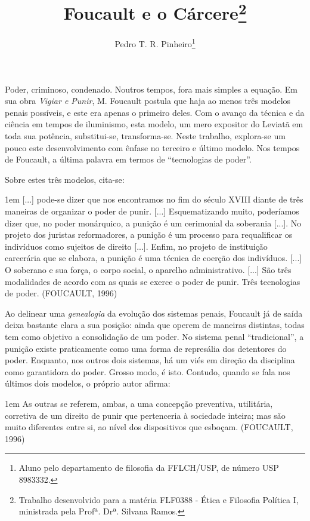 \documentclass[12pt,a4paper]{article}
\author{Pedro T. R. Pinheiro\footnote{Aluno pelo departamento de filosofia 
da FFLCH/USP, de número USP 8983332. }}
\title{Foucault e o Cárcere\footnote{
	Trabalho desenvolvido para a matéria FLF0388 - Ética e Filosofia 
	Política I, ministrada pela Profª. Drª. Silvana Ramos. }}
\newenvironment{citac}
{
	\begin{addmargin}
		[4cm]{1em} \footnotesize}{\normalfont 
	\end{addmargin}
}
\begin{document}
	\maketitle
	
	\onehalfspacing
	\setlength{\parskip}{0.5cm}
	
	Poder, criminoso, condenado. Noutros tempos, fora mais simples a 
	equação. Em sua obra \textit{Vigiar e Punir}, M. Foucault postula 
	que haja ao menos três modelos penais possíveis, e este era apenas 
	o primeiro deles. Com o avanço da técnica e da ciência em tempos de 
	iluminismo, esta modelo, um mero expositor do Leviatã em toda sua 
	potência, substitui-se, transforma-se. Neste trabalho, explora-se 
	um pouco este desenvolvimento com ênfase no terceiro e último 
	modelo. Nos tempos de Foucault, a última palavra em termos de 
	``tecnologias de poder''. 

	Sobre estes três modelos, cita-se: 
	
	\begin{citac}
		[...] pode-se dizer que nos encontramos no fim do século XVIII 
		diante de três maneiras de organizar o poder de punir. [...] 
		Esquematizando muito, poderíamos dizer que, no poder 
		monárquico, a punição é um cerimonial da soberania [...]. No 
		projeto dos juristas reformadores, a punição é um processo 
		para requalificar os indivíduos como sujeitos de direito 
		[...]. Enfim, no projeto de instituição carcerária que se 
		elabora, a punição é uma técnica de coerção dos indivíduos. 
		[...] O soberano e sua força, o corpo social, o aparelho 
		administrativo. [...] São três modalidades de acordo com 
		as quais se exerce o poder de punir. Três tecnologias de poder. 
		(FOUCAULT, 1996)
	\end{citac}

	Ao delinear uma \emph{genealogia} da evolução dos sistemas penais, 
	Foucault já de saída deixa bastante clara a sua posição: ainda que 
	operem de maneiras distintas, todas tem como objetivo a consolidação 
	de um poder. No sistema penal ``tradicional'', a punição existe 
	praticamente como uma forma de represália dos detentores do poder. 
	Enquanto, nos outros dois sistemas, há um viés em direção da 
	disciplina como garantidora do poder. Grosso modo, é isto. Contudo, 
	quando se fala nos últimos dois modelos, o próprio autor afirma: 
	\newpage %
	\begin{citac}
		As outras se referem, ambas, a uma concepção preventiva, 
		utilitária, corretiva de um direito de punir que pertenceria 
		à sociedade inteira; mas são muito diferentes entre si, ao 
		nível dos dispositivos que esboçam. (FOUCAULT, 1996)
	\end{citac}
\end{document}
